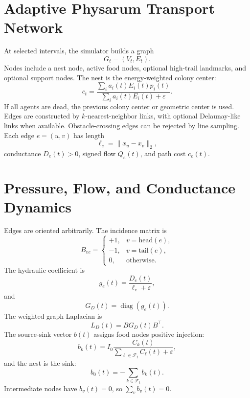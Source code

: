 \documentclass[11pt]{article}
\begin{document}
\section{Adaptive Physarum Transport Network}
At selected intervals, the simulator builds a graph
\begin{equation}
  G_t=(V_t,E_t).
\end{equation}
Nodes include a nest node, active food nodes, optional high-trail landmarks, and
optional support nodes. The nest is the energy-weighted colony center:
\begin{equation}
  c_t=\frac{\sum_i a_i(t)E_i(t)p_i(t)}{\sum_i a_i(t)E_i(t)+\varepsilon}.
\end{equation}
If all agents are dead, the previous colony center or geometric center is used.
Edges are constructed by $k$-nearest-neighbor links, with optional Delaunay-like
links when available. Obstacle-crossing edges can be rejected by line sampling.
Each edge $e=(u,v)$ has length
\begin{equation}
  \ell_e=\|x_u-x_v\|_2,
\end{equation}
conductance $D_e(t)>0$, signed flow $Q_e(t)$, and path cost $c_e(t)$.

\section{Pressure, Flow, and Conductance Dynamics}
Edges are oriented arbitrarily. The incidence matrix is
\begin{equation}
  B_{ve}=
  \begin{cases}
  +1, & v=\mathrm{head}(e),\\
  -1, & v=\mathrm{tail}(e),\\
  0, & \text{otherwise}.
  \end{cases}
\end{equation}
The hydraulic coefficient is
\begin{equation}
  g_e(t)=\frac{D_e(t)}{\ell_e+\varepsilon},
\end{equation}
and
\begin{equation}
  G_D(t)=\operatorname{diag}(g_e(t)).
\end{equation}
The weighted graph Laplacian is
\begin{equation}
  L_D(t)=BG_D(t)B^\top.
\end{equation}
The source-sink vector $b(t)$ assigns food nodes positive injection:
\begin{equation}
  b_k(t)=I_0\frac{C_k(t)}{\sum_{\ell\in\mathcal{F}_t}C_\ell(t)+\varepsilon},
\end{equation}
and the nest is the sink:
\begin{equation}
  b_0(t)=-\sum_{k\in\mathcal{F}_t}b_k(t).
\end{equation}
Intermediate nodes have $b_v(t)=0$, so $\sum_vb_v(t)=0$.
\end{document}

